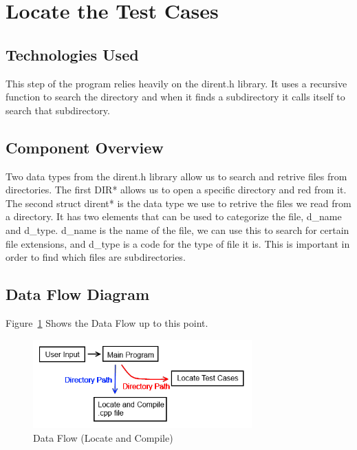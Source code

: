 \section{Locate the Test Cases }

\subsection{Technologies  Used}
This step of the program relies heavily on the dirent.h library.  It uses a recursive function to search the directory and when
it finds a subdirectory it calls itself to search that subdirectory.

\subsection{Component  Overview}
Two data types from the dirent.h library allow us to search and retrive files from directories.  The first DIR* allows us to open
a specific directory and red from it.  The second struct dirent* is the data type we use to retrive the files we read from a directory.
It has two elements that can be used to categorize the file, d\_name and d\_type.  d\_name is the name of the file, we can use this
to search for certain file extensions, and d\_type is a code for the type of file it is.  This is important in order to find which files are
subdirectories. 

\subsection{Data Flow Diagram}
Figure~\ref{DataFlow2} Shows the Data Flow up to this point.

\begin{figure}[tbh]
\begin{center}
\includegraphics[width=0.75\textwidth]{./DataFlow2}
\end{center}
\caption{Data Flow (Locate and Compile) \label{DataFlow2}}
\end{figure}


